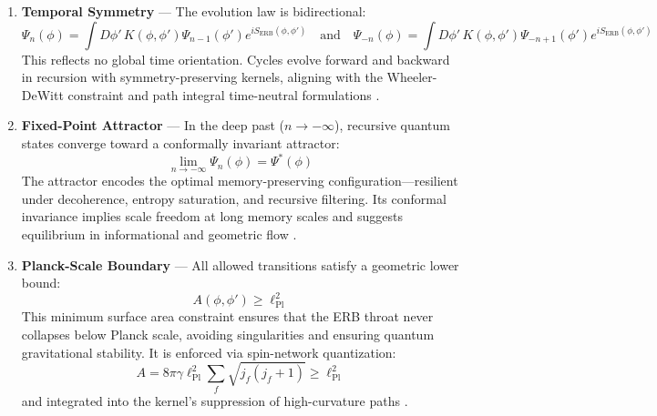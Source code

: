 \begin{enumerate}
    \item \textbf{Temporal Symmetry} — The evolution law is bidirectional: 
    \[
    \Psi_n(\phi) = \int D\phi' \, K(\phi, \phi') \Psi_{n-1}(\phi') e^{i S_{\text{ERB}}(\phi, \phi')}
    \quad \text{and} \quad
    \Psi_{-n}(\phi) = \int D\phi' \, K(\phi, \phi') \Psi_{-n+1}(\phi') e^{i S_{\text{ERB}}(\phi, \phi')}
    \]
    This reflects no global time orientation. Cycles evolve forward and backward in recursion with symmetry-preserving kernels, aligning with the Wheeler-DeWitt constraint and path integral time-neutral formulations \cite{hartle1990time}.

    \item \textbf{Fixed-Point Attractor} — In the deep past (\( n \to -\infty \)), recursive quantum states converge toward a conformally invariant attractor:
    \[
    \lim_{n \to -\infty} \Psi_n(\phi) = \Psi^*(\phi)
    \]
    The attractor encodes the optimal memory-preserving configuration—resilient under decoherence, entropy saturation, and recursive filtering. Its conformal invariance implies scale freedom at long memory scales and suggests equilibrium in informational and geometric flow \cite{ashtekar2011loop}.

    \item \textbf{Planck-Scale Boundary} — All allowed transitions satisfy a geometric lower bound:
    \[
    A(\phi, \phi') \geq \ell_{\text{Pl}}^2
    \]
    This minimum surface area constraint ensures that the ERB throat never collapses below Planck scale, avoiding singularities and ensuring quantum gravitational stability. It is enforced via spin-network quantization: 
    \[
    A = 8\pi \gamma \ell_{\text{Pl}}^2 \sum_f \sqrt{j_f(j_f+1)} \geq \ell_{\text{Pl}}^2
    \]
    and integrated into the kernel’s suppression of high-curvature paths \cite{bojowald2001absence, rovelli1995discreteness}.
\end{enumerate}
